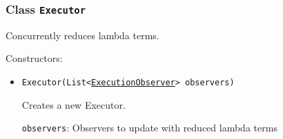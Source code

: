 \subsubsection{Class \texttt{Executor}}
\label{type:edu.kit.wavelength.client.view.execution.Executor}
Concurrently reduces lambda terms.

Constructors:
\begin{itemize}
\item \texttt{Executor(List<\hyperref[type:edu.kit.wavelength.client.view.execution.ExecutionObserver]{ExecutionObserver}> observers)}

Creates a new Executor.

\texttt{observers}: Observers to update with reduced lambda terms

\end{itemize}

